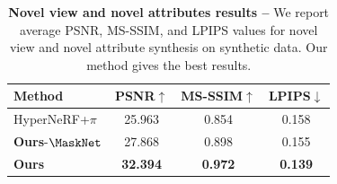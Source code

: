 \begin{table}
  \centering
  \begin{tabular}{@{}lccc@{}}
    \toprule
    Method                     & PSNR$\uparrow$  & MS-SSIM$\uparrow$ & LPIPS$\downarrow$ \\
    \midrule
    HyperNeRF{+}$\pi$          & 25.963          & 0.854             & 0.158             \\
    \textbf{Ours}{-}$\MaskNet$ & 27.868          & 0.898             & 0.155             \\
    \textbf{Ours}              & \textbf{32.394} & \textbf{0.972}    & \textbf{0.139}    \\
    \bottomrule
  \end{tabular}
  \caption[Quantitative comparison between \conerf and baselines on the synthetic dataset]{
    \textbf{Novel view and novel attributes results -- }
    We report average PSNR, MS-SSIM, and LPIPS values for novel view and novel
    attribute synthesis on synthetic data.
    Our method gives the best results.
  } %
  \label{tab:conerf-kubric3d}
\end{table}